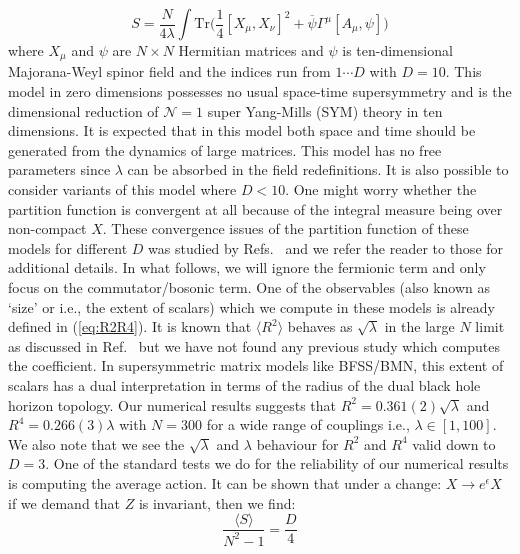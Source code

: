 \documentclass[letter,11pt]{article}
\begin{document}
\begin{equation}
	\label{eq:IKKT} 
S = \frac{N}{4\lambda} \int \mbox{Tr} \Big( \frac{1}{4} [X_\mu, X_\nu]^{2} + \overline{\psi} \Gamma^{\mu} [A_{\mu},\psi] \Big) 
\end{equation}
where $X_{\mu}$ and $\psi$ are $N \times N$ Hermitian matrices and $\psi$ is ten-dimensional Majorana-Weyl spinor field and the indices run from $ 1 \cdots D$ with $D=10$. This model in zero dimensions possesses no usual space-time supersymmetry and is the dimensional reduction of $\mathcal{N}=1$ super Yang-Mills (SYM) theory in ten dimensions. It is expected that in this model both space and time should be generated from the dynamics of large matrices. This model has no free parameters since $\lambda$ can be absorbed in the field redefinitions. It is also possible to consider variants of this model where $D < 10$. One might worry whether the partition function is convergent at all because of the integral measure being over non-compact $X$. These convergence issues of the partition function of these models for different $D$ was studied by Refs.~\cite{Krauth:1998yu,Krauth:1999qw} and we
refer the reader to those for additional details.  In what follows, we will ignore the fermionic 
term and only focus on the commutator/bosonic term. One of the observables (also known as `size' or i.e., the extent of scalars) which we compute in these models is already defined in (\ref{eq:R2R4}). It is known that $\langle R^2 \rangle$ behaves as $\sqrt{\lambda}$ in the large $N$ limit as discussed in Ref.~\cite{Hotta:1998en} but we have not found any previous study
which computes the coefficient. In supersymmetric matrix models like BFSS/BMN, this 
extent of scalars has a dual interpretation in terms of the radius of 
the dual black hole horizon topology.  Our numerical results suggests 
that $R^2 = 0.361(2) \sqrt{\lambda}$ 
and $R^4 = 0.266(3) \lambda$ with $N = 300$ for a wide range of couplings i.e., 
$\lambda \in [1,100]$. 
We also note that we see the $\sqrt{\lambda}$ and $\lambda$ behaviour for 
$R^2$ and $R^4$ valid down to $D=3$. 
One of the standard tests we do for the reliability of our numerical results is 
computing the average action. It can be shown that under a 
change: $X \to e^{\epsilon} X$ if we demand that $Z$ is invariant, 
then we find:
\begin{equation}
\label{eq:SD_IKKT1} 
	\frac{\langle S \rangle}{N^2 - 1} = \frac{D}{4} 
\end{equation}
\end{document}
